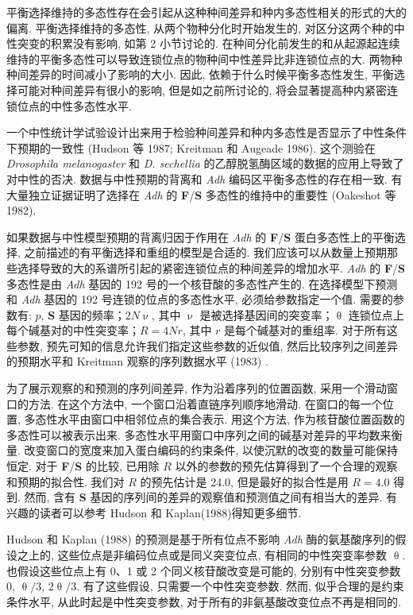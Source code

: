 \documentclass[
    12pt,%
    ]{article}
\begin{document}
平衡选择维持的多态性存在会引起从这种种间差异和种内多态性相关的形式的大的偏离. 平衡选择维持的多态性,
从两个物种分化时开始发生的, 对区分这两个种的中性突变的积累没有影响, 如第 2 小节讨论的.
在种间分化前发生的和从起源起连续维持的平衡多态性可以导致连锁位点的物种间中性差异比非连锁位点的大.
两物种种间差异的时间减小了影响的大小. 因此, 依赖于什么时候平衡多态性发生, 平衡选择可能对种间差异有很小的影响,
但是如之前所讨论的, 将会显著提高种内紧密连锁位点的中性多态性水平.

一个中性统计学试验设计出来用于检验种间差异和种内多态性是否显示了中性条件下预期的一致性 (Hudson 等 1987; Kreitman 和
Augeade 1986). 这个测验在 \textit{Drosophila melanogaster} 和 \textit{D.
sechellia} 的乙醇脱氢酶区域的数据的应用上导致了对中性的否决.
数据与中性预期的背离和 \textit{Adh} 编码区平衡多态性的存在相一致.
有大量独立证据证明了选择在 \textit{Adh} 的 \textbf{F}/\textbf{S} 多态性的维持中的重要性 (Oakeshot 等 1982).

如果数据与中性模型预期的背离归因于作用在 \textit{Adh} 的 \textbf{F}/\textbf{S} 蛋白多态性上的平衡选择,
之前描述的有平衡选择和重组的模型是合适的.
我们应该可以从数量上预期那些选择导致的大的系谱所引起的紧密连锁位点的种间差异的增加水平.
\textit{Adh} 的 \textbf{F}/\textbf{S} 多态性是由 \textit{Adh} 基因的 192 号的一个核苷酸的多态性产生的.
在选择模型下预测和 \textit{Adh} 基因的 192 号连锁的位点的多态性水平, 必须给参数指定一个值. 需要的参数有: $p$,
\textbf{S} 基因的频率；$2N\upnu$, 其中 $\upnu$ 是被选择基因间的突变率；$\uptheta$
连锁位点上每个碱基对的中性突变率；$R=4Nr$, 其中 $r$ 是每个碱基对的重组率. 对于所有这些参数,
预先可知的信息允许我们指定这些参数的近似值, 然后比较序列之间差异的预期水平和 Kreitman 观察的序列数据水平 (1983) .

为了展示观察的和预测的序列间差异, 作为沿着序列的位置函数, 采用一个滑动窗口的方法. 在这个方法中,
一个窗口沿着直链序列顺序地滑动. 在窗口的每一个位置, 多态性水平由窗口中相邻位点的集合表示. 用这个方法,
作为核苷酸位置函数的多态性可以被表示出来. 多态性水平用窗口中序列之间的碱基对差异的平均数来衡量.
改变窗口的宽度来加入蛋白编码的约束条件, 以使沉默的改变的数量可能保持恒定. 对于 \textbf{F}/\textbf{S} 的比较, 已用除 $R$
以外的参数的预先估算得到了一个合理的观察和预期的拟合性. 我们对 $R$ 的预先估计是 24.0, 但是最好的拟合性是用 $R=4.0$
得到. 然而, 含有 \textbf{S} 基因的序列间的差异的观察值和预测值之间有相当大的差异. 有兴趣的读者可以参考 Hudson 和
Kaplan(1988)得知更多细节.

Hudson 和 Kaplan (1988) 的预测是基于所有位点不影响 \textit{Adh} 酶的氨基酸序列的假设之上的,
这些位点是非编码位点或是同义突变位点, 有相同的中性突变率参数 $\uptheta$. 也假设这些位点上有 0、1 或 2
个同义核苷酸改变是可能的, 分别有中性突变参数 0, $\uptheta /3$, $2 \uptheta /3$. 有了这些假设, 只需要一个中性突变参数. 然而,
似乎合理的是约束条件水平, 从此时起是中性突变参数, 对于所有的非氨基酸改变位点不再是相同的.
\end{document}
